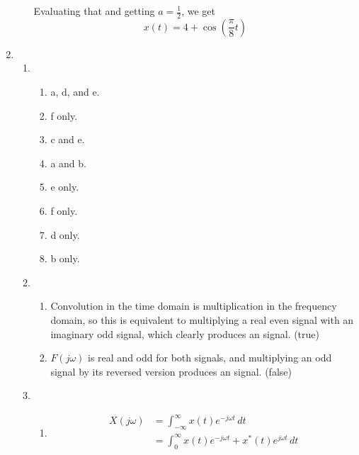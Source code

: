 \documentclass[12pt]{article}
\begin{document}
\begin{enumerate}
\begin{enumerate}
                        Evaluating that and getting $a=\frac{1}{2}$, we get \[x(t)=4+\cos\left(\frac{\pi}{8}t\right)\]
            \end{enumerate}
      \item \begin{enumerate}
                  \item \begin{enumerate}
                              \item a, d, and e.
                              \item f only.
                              \item c and e.
                              \item a and b.
                              \item e only.
                              \item f only.
                              \item d only.
                              \item b only.
                        \end{enumerate}
                  \item \begin{enumerate}
                              \item Convolution in the time domain is multiplication in the frequency domain,
                                    so this is equivalent to multiplying a real even signal with an imaginary odd signal,
                                    which clearly produces an  signal. (true)
                              \item $F(j\omega)$ is real and odd for both signals,
                                    and multiplying an odd signal by its reversed version
                                    produces an  signal. (false)
                        \end{enumerate}
                  \item \begin{enumerate}
                              \item \[\begin{aligned}
                                                X(j\omega)
                                                 & = \int_{-\infty}^{\infty} x(t)e^{-j\omega t}\,dt                             \\
                                                 & = \int_{0}^{\infty} x(t)e^{-j\omega t}+x^*(t)e^{j\omega t}\,dt               \\

\end{aligned}\]
\end{enumerate}
\end{enumerate}
\end{enumerate}
\end{document}
